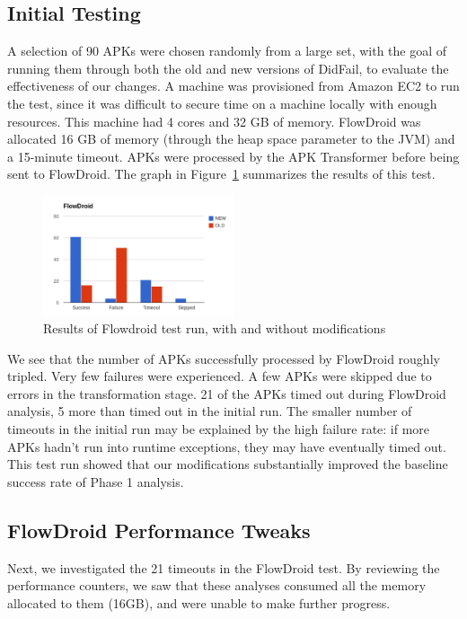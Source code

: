\subsection{Initial Testing}
A selection of 90 APKs were chosen randomly from a large set, with the goal of running them through both the old and new versions of DidFail, to evaluate the effectiveness of our changes.  A machine was provisioned from Amazon EC2 to run the test, since it was difficult to secure time on a machine locally with enough resources.  This machine had 4 cores and 32 GB of memory.  FlowDroid was allocated 16 GB of memory (through the heap space parameter to the JVM) and a 15-minute timeout.  APKs were processed by the APK Transformer before being sent to FlowDroid.  The graph in Figure~\ref{fig:initial_phase1} summarizes the results of this test.

\begin{figure}[h]
	\centering
	\includegraphics[width=0.50\textwidth]{flowdroid_success.pdf}
	\caption{Results of Flowdroid test run, with and without modifications}
	\label{fig:initial_phase1}
\end{figure}

We see that the number of APKs successfully processed by FlowDroid roughly tripled.   Very few failures were experienced.  A few APKs were skipped due to errors in the transformation stage.  21 of the APKs timed out during FlowDroid analysis, 5 more than timed out in the initial run.  The smaller number of timeouts in the initial run may be explained by the high failure rate: if more APKs hadn't run into runtime exceptions, they may have eventually timed out.  This test run showed that our modifications substantially improved the baseline success rate of Phase 1 analysis.

\subsection{FlowDroid Performance Tweaks}
Next, we investigated the 21 timeouts in the FlowDroid test.  By reviewing the performance counters, we saw that these analyses consumed all the memory allocated to them (16GB), and were unable to make further progress.

